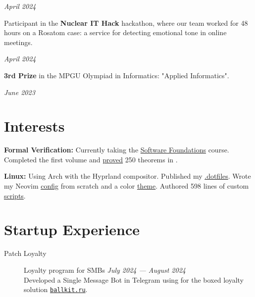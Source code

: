 \documentclass[margin,line]{resume}
\begin{document}
\begin{resume}
  \hfill \textsl{April 2024}

  Participant in the \textbf{Nuclear IT Hack} hackathon, where our
  team worked for 48 hours on a Rosatom case: a service for detecting
  emotional tone in online meetings.

  \vspace{-7mm}

  \hfill \textsl{April 2024}

  \textbf{3rd Prize} in the MPGU Olympiad in Informatics: "Applied Informatics".
  \vspace{-2mm}

  \hfill \textsl{June 2023}
  \vspace{-4mm}
  \section{\mysidestyle Interests}\vspace{0.7mm}

  {\textbf{Formal Verification:} Currently taking the
    \href{https://softwarefoundations.cis.upenn.edu}{Software
    Foundations} course. Completed the first volume and
    \href{https://github.com/alchemmist/coq-learning}{proved} 250
  theorems in .} \\

  \vspace{-6mm}

  \textbf{Linux:} Using Arch with the Hyprland compositor. Published
  my \href{https:/github.com/alchemmist/.dotfiles}{.dotfiles}. Wrote
  my Neovim
  \href{https://github.com/alchemmist/.dotfiles/tree/main/nvim}{config}
  from scratch and a color
  \href{https://github.com/alchemmist/nothing.nvim}{theme}. Authored
  598 lines of custom
  \href{https://github.com/alchemmist/.dotfiles/tree/main/scripts}{scripts}.

  \vfill

  \section{\mysidestyle Startup Experience}\vspace{2mm}

  \begin{description}

    \item[Patch Loyalty]\small Loyalty program for SMBs \hfill
      \textsl{July 2024 — August 2024}\vspace{1mm}\\
      Developed a Single Message Bot in Telegram using
       for the boxed loyalty solution
      \href{https://ballkit.ru}{\texttt{ballkit.ru}}.


\end{description}
\end{resume}
\end{document}
